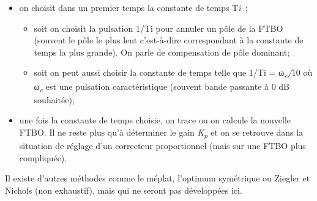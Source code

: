 \begin{itemize}
\item
  on choisit dans un premier temps la constante de temps T\emph{i~};

  \begin{itemize}
  \item
    soit on choisit la pulsation 1/Ti pour annuler un pôle de la FTBO (souvent le pôle le plus lent c'est-à-dire correspondant à la constante de temps la plus grande). On parle de compensation de pôle dominant;
  \item
    soit on peut aussi choisir la constante de temps telle que 1/Ti = ω\emph{\textsubscript{c}/}10 où ω\emph{\textsubscript{c}} est une pulsation caractéristique (souvent bande passante à 0 dB souhaitée);
  \end{itemize}
\item
  une fois la constante de temps choisie, on trace ou on calcule la nouvelle FTBO. Il ne reste plus qu'à déterminer le gain \emph{K\textsubscript{p}} et on se retrouve dans la situation de réglage d'un correcteur proportionnel (mais sur une FTBO plus compliquée).
\end{itemize}

Il existe d'autres méthodes comme le méplat, l'optimum symétrique ou Ziegler et Nichols (non exhaustif), mais qui ne seront pas développées ici.

